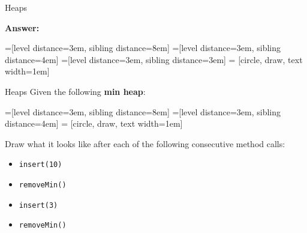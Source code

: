 \documentclass[9pt]{beamer}
\begin{document}
\begin{frame}[fragile]{Heaps}

  {\bf Answer:}

  =[level distance=3em, sibling distance=8em]
  =[level distance=3em, sibling distance=4em]
  =[level distance=3em, sibling distance=3em]
   = [circle, draw, text width=1em]

\end{frame}

\begin{frame}[fragile]{Heaps}
  Given the following {\bf min heap}:

  =[level distance=3em, sibling distance=8em]
  =[level distance=3em, sibling distance=4em]
   = [circle, draw, text width=1em]


  Draw what it looks like after each of the following consecutive method
  calls:
  \begin{itemize}
    \item
      {\tt insert(10)}
    \item
      {\tt removeMin()}
    \item
      {\tt insert(3)}
    \item
      {\tt removeMin()}
  \end{itemize}
\end{frame}
\end{document}
